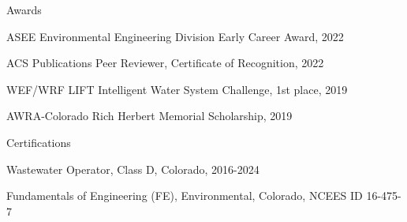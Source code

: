 \documentclass{resume} %
\begin{document}

\begin{rSection}{Awards}

ASEE Environmental Engineering Division Early Career Award, 2022

ACS Publications Peer Reviewer, Certificate of Recognition, 2022

WEF/WRF LIFT Intelligent Water System Challenge, 1st place, 2019

AWRA-Colorado Rich Herbert Memorial Scholarship, 2019

\end{rSection}


\begin{rSection}{Certifications}

Wastewater Operator, Class D, Colorado, 2016-2024

Fundamentals of Engineering (FE), Environmental, Colorado, NCEES ID 16-475-7
\end{rSection}
\end{document}
